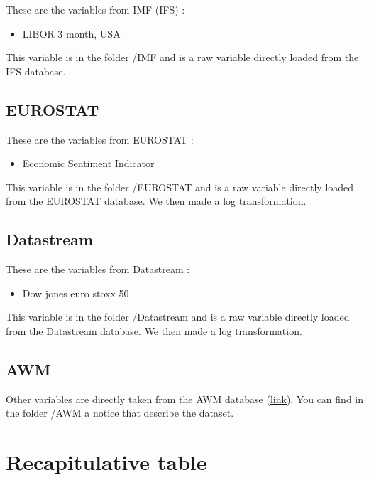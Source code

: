 \documentclass[11pt,a4paper]{article}
\begin{document}
These are the variables from IMF (IFS) :
\begin{itemize}
\item LIBOR 3 month, USA
\end{itemize}

\vspace{0.5cm}

This variable is in the folder /IMF and is a raw variable directly loaded from the IFS database.

\subsection{EUROSTAT}

These are the variables from EUROSTAT :
\begin{itemize}
\item Economic Sentiment Indicator
\end{itemize}

\vspace{0.5cm}

This variable is in the folder /EUROSTAT and is a raw variable directly loaded from the EUROSTAT database. We then made a log transformation. 

\subsection{Datastream}

These are the variables from Datastream :
\begin{itemize}
\item Dow jones euro stoxx 50
\end{itemize}

\vspace{0.5cm}

This variable is in the folder /Datastream and is a raw variable directly loaded from the Datastream database. We then made a log transformation. 


\subsection{AWM}

Other variables are directly taken from the AWM database (\href{http://www.eabcn.org/page/area-wide-model}{link}). You can find in the folder /AWM a notice that describe the dataset. 


\section{Recapitulative table}
\end{document}
